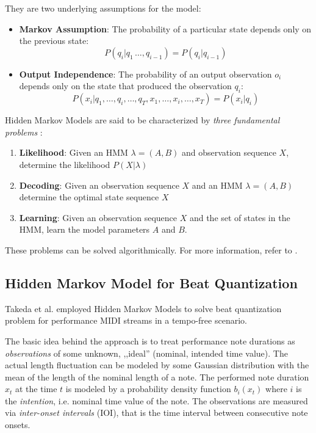 They are two underlying assumptions for the model: \begin{itemize}
	\item {\bf Markov Assumption}: The probability of a particular state depends only on the previous state: $$P\left(q_i|q_1\,\ldots,q_{i-1}\right) = P(q_i|q_{i-1})$$
	\item {\bf Output Independence}: The probability of an output observation $o_i$ depends only on the state that produced the observation $q_i$: $$P\left(x_i|q_1,\ldots,q_i,\ldots,q_T,x_1,\ldots,x_i,\ldots, x_T\right)=P(x_i|q_i)$$
\end{itemize}

Hidden Markov Models are said to be characterized by \emph{three fundamental problems} \cite[p. 213]{Jurafsky2009}: \begin{enumerate}
	\item {\bf Likelihood}: Given an HMM $\lambda = (A, B)$ and observation sequence $X$, determine the likelihood $P(X|\lambda)$
	\item {\bf Decoding}: Given an observation sequence $X$ and an HMM $\lambda=(A, B)$ determine the optimal state sequence $X$
	\item {\bf Learning}: Given an observation sequence $X$ and the set of states in the HMM, learn the model parameters $A$ and $B$.
\end{enumerate}

These problems can be solved algorithmically. For more information, refer to \cite[p. 213--226]{Jurafsky2009}.

\subsection{Hidden Markov Model for Beat Quantization}

Takeda et al. \cite{Takeda2002} employed Hidden Markov Models to solve beat quantization problem for performance MIDI streams in a tempo-free scenario. 

The basic idea behind the approach is to treat performance note durations as \emph{observations} of some unknown, ,,ideal'' (nominal, intended time value). The actual length fluctuation can be modeled by some Gaussian distribution with the mean of the length of the nominal length of a note. The performed note duration $x_t$ at the time $t$ is modeled by a probability density function $b_i(x_t)$ where $i$ is the \emph{intention}, i.e. nominal time value of the note. The observations are measured via \emph{inter-onset intervals} (IOI), that is the time interval between consecutive note onsets.

